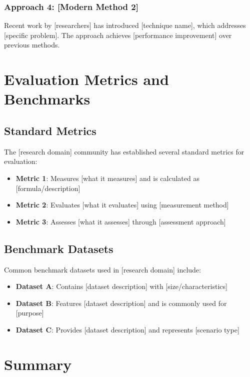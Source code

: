 \subsubsection{Approach 4: [Modern Method 2]}
Recent work by [researchers] \cite{example-reference-4} has introduced [technique name], which addresses [specific problem]. The approach achieves [performance improvement] over previous methods.

\section{Evaluation Metrics and Benchmarks}

\subsection{Standard Metrics}

The [research domain] community has established several standard metrics for evaluation:

\begin{itemize}
    \item \textbf{Metric 1}: Measures [what it measures] and is calculated as [formula/description]
    \item \textbf{Metric 2}: Evaluates [what it evaluates] using [measurement method]
    \item \textbf{Metric 3}: Assesses [what it assesses] through [assessment approach]
\end{itemize}

\subsection{Benchmark Datasets}

Common benchmark datasets used in [research domain] include:

\begin{itemize}
    \item \textbf{Dataset A}: Contains [dataset description] with [size/characteristics]
    \item \textbf{Dataset B}: Features [dataset description] and is commonly used for [purpose]
    \item \textbf{Dataset C}: Provides [dataset description] and represents [scenario type]
\end{itemize}

\section{Summary}

